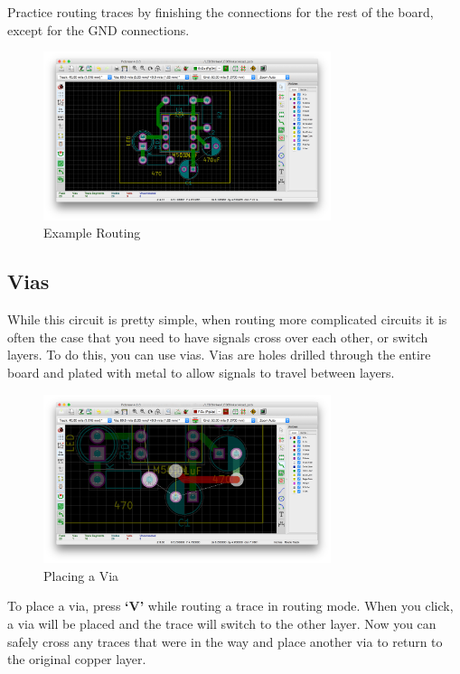 \documentclass[12pt, oneside]{article}
\begin{document}
Practice routing traces by finishing the connections for the rest of the board, except for the GND connections. 

\begin{figure}[H]
\includegraphics[width=0.75\textwidth]{ExampleRouting}
\centering
\caption{Example Routing}
\end{figure}

\subsection{Vias}
While this circuit is pretty simple, when routing more complicated circuits it is often the case that you need to have signals cross over each other, or switch layers. To do this, you can use vias. Vias are holes drilled through the entire board and plated with metal to allow signals to travel between layers. 

\begin{figure}[H]
\includegraphics[width=0.75\textwidth]{PlaceVia}
\centering
\caption{Placing a Via}
\end{figure}

To place a via, press \textbf{`V'} while routing a trace in routing mode. When you click, a via will be placed and the trace will switch to the other layer. Now you can safely cross any traces that were in the way and place another via to return to the original copper layer.
\end{document}
